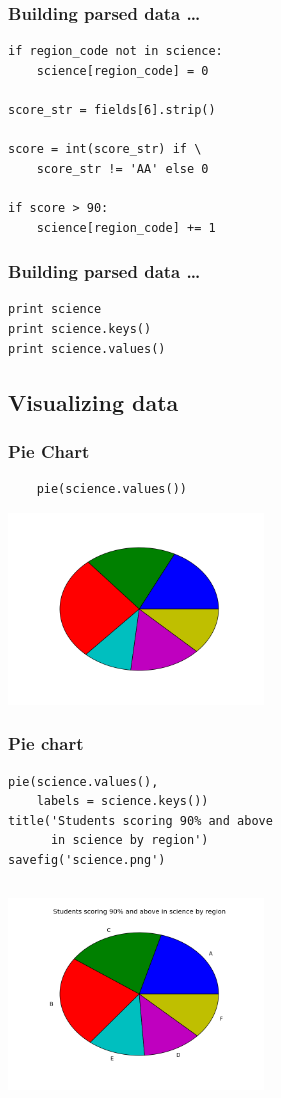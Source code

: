 \documentclass[14pt,compress]{beamer}
\newcounter{time}
\newcommand{\inctime}[1]{\addtocounter{time}{#1}{\tiny \thetime\ m}}
\begin{document}
\begin{frame}[fragile]
  \frametitle{Building parsed data \ldots}
  \begin{lstlisting}
if region_code not in science:
    science[region_code] = 0

score_str = fields[6].strip()

score = int(score_str) if \
    score_str != 'AA' else 0

if score > 90:
    science[region_code] += 1
  \end{lstlisting}
\end{frame}

\begin{frame}[fragile]
  \frametitle{Building parsed data \ldots}
  \begin{lstlisting}
print science
print science.keys()
print science.values()
  \end{lstlisting}
\end{frame}

\subsection{Visualizing data}
\begin{frame}[fragile]
  \frametitle{Pie Chart}
  \begin{lstlisting}
    pie(science.values())
  \end{lstlisting}
\includegraphics[height=2in, interpolate=true]{data/science_nolabel}
\end{frame}

\begin{frame}[fragile]
  \frametitle{Pie chart}
  \small
  \begin{lstlisting}
pie(science.values(), 
    labels = science.keys())
title('Students scoring 90% and above 
      in science by region')
savefig('science.png')
  \end{lstlisting}
\begin{columns}
    \hspace*{1.1in}
\includegraphics[height=2in, interpolate=true]{data/science}
\end{columns}
  \inctime{10}
\end{frame}
\end{document}
